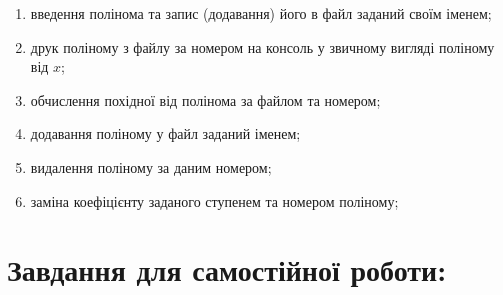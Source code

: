 \documentclass[a5paper,titlepage,openany,twoside,
]
{book_unv}%
\makeatletter
\newcommand{\xslalph}[1]{\expandafter\@xslalph\csname c@#1\endcsname}
\newcommand{\@xslalph}[1]{%
    \ifcase#1\or а\or б\or в\or г\or д\or e\or є\or ж\or з\or i%
    \or й\or к\or л\or м\or н\or о\or п\or р\or с\or т%
    \or у\or ф\or х\or ц\or ч\or ш\or ю\or я\or аа\or бб\or вв%
    \else\@ctrerr\fi%
}
\makeatother
\begin{document}
\begin{enumerate}
\begin{enumerate}[label=\xslalph*)]
\item
введення полінома та запис (додавання) його в файл заданий своїм іменем; 
\item
друк поліному з файлу за номером на консоль у звичному вигляді поліному від $x$;
\item
обчислення похідної від полінома за файлом та номером;
\item
додавання поліному у файл заданий іменем;
\item
видалення поліному за даним номером;
\item
заміна коефіцієнту заданого ступенем та номером поліному;

\end{enumerate}

\end{enumerate}


\section{Завдання для самостійної роботи:}
\end{document}
